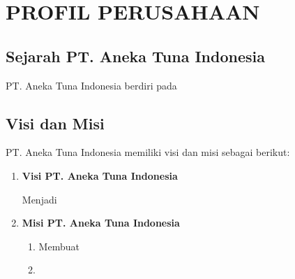 \chapter{PROFIL PERUSAHAAN}
\vspace{4ex}

\setlength{\parindent}{7ex}


\section{Sejarah PT. Aneka Tuna Indonesia}
\vspace{1ex}

PT. Aneka Tuna Indonesia berdiri pada \lipsum[1]
\vspace{0.5ex}

\lipsum[2]
\vspace{0.5ex}

\section{Visi dan Misi}
\vspace{1ex}

PT. Aneka Tuna Indonesia memiliki visi dan misi sebagai berikut:
\vspace{0.5ex}

\begin{enumerate}[nolistsep]

  \item \textbf{Visi PT. Aneka Tuna Indonesia}
  \vspace{0.5ex}

  Menjadi \lipsum[1][1-3]
  \vspace{0.5ex}

  \item \textbf{Misi PT. Aneka Tuna Indonesia}
  \vspace{0.5ex}

  \begin{enumerate}[nolistsep]

    \item Membuat \lipsum[1][1-2]
    \vspace{0.5ex}

    \item \lipsum[1][3-4]
    \vspace{0.5ex}

  \end{enumerate}
  \vspace{0.5ex}

\end{enumerate}
\vspace{0.5ex}

